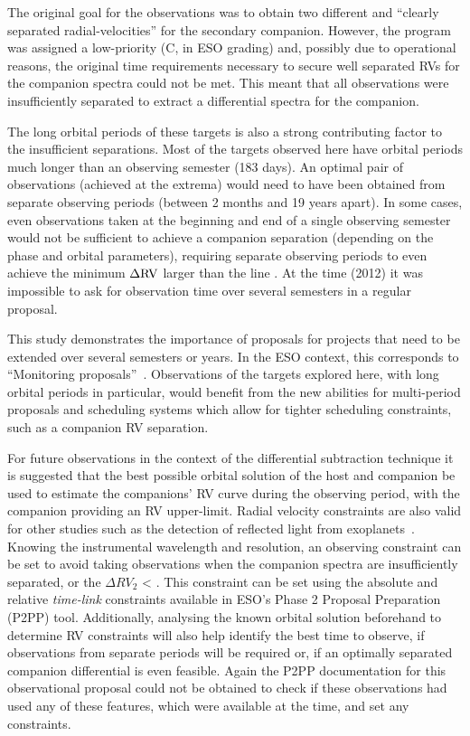 The original goal for the observations was to obtain two different and ``clearly separated radial-velocities'' for the secondary companion.
However, the program was assigned a low-priority (C, in {ESO} grading) and, possibly due to operational reasons, the original time requirements necessary to secure well separated {RV}s for the companion spectra could not be met.
This meant that all observations were insufficiently separated to extract a differential spectra for the companion.

The long orbital periods of these targets is also a strong contributing factor to the insufficient separations.
Most of the targets observed here have orbital periods much longer than an observing semester (183 days).
An optimal pair of observations (achieved at the extrema) would need to have been obtained from separate observing periods (between 2 months and 19 years apart).
In some cases, even observations taken at the beginning and end of a single observing semester would not be sufficient to achieve a companion separation (depending on the phase and orbital parameters), requiring separate observing periods to even achieve the minimum \(\Delta \rm {RV}\) larger than the line {\fwhm}.
At the time (2012) it was impossible to ask for observation time over several semesters in a regular proposal.

This study demonstrates the importance of proposals for projects that need to be extended over several semesters or years.
In the {ESO} context, this corresponds to ``Monitoring proposals''~\citep[e.g.][pg.~18]{eso_eso_2017}.
Observations of the targets explored here, with long orbital periods in particular, would benefit from the new abilities for multi-period proposals and scheduling systems which allow for tighter scheduling constraints, such as a companion {RV} separation.

For future observations in the context of the differential subtraction technique it is suggested that the best possible orbital solution of the host and companion be used to estimate the companions' {RV} curve during the observing period, with the companion \Mtwosini{} providing an {RV} upper-limit.
Radial velocity constraints are also valid for other studies such as the detection of reflected light from exoplanets~\cite[e.g.]{martins_evidence_2015}.
Knowing the instrumental wavelength and resolution, an observing constraint can be set to avoid taking observations when the companion spectra are insufficiently separated, or the \(\Delta {RV}_2\) < {\fwhm}.
This constraint can be set using the absolute and relative \emph{time-link} constraints available in {ESO}'s {Phase 2 Proposal Preparation} (P2PP) tool.
Additionally, analysing the known orbital solution beforehand to determine {RV} constraints will also help identify the best time to observe, if observations from separate periods will be required or, if an optimally separated companion differential is even feasible.
Again the {P2PP} documentation for this observational proposal could not be obtained to check if these observations had used any of these features, which were available at the time, and set any constraints.


